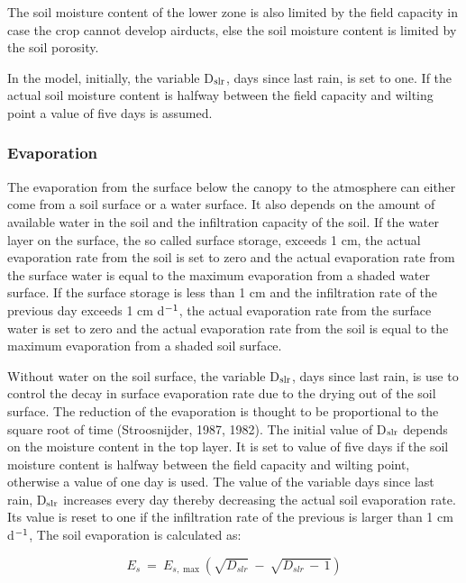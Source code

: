 The soil moisture content of the lower zone is also limited by the field capacity in case the crop cannot develop airducts, else the soil moisture content is limited by the soil porosity. 

In the model, initially, the variable D$_{{\rm slr}}$, days since last rain, is set  to one. If the actual soil moisture content is halfway between the field capacity and wilting point a value of five days is assumed. 

\subsubsection{Evaporation}
\label{sec:evaporation}
The evaporation from the surface below the canopy to the atmosphere can either come from a soil surface or a water surface. It also depends on the amount of available water in the soil and the infiltration capacity of the soil. If the water layer on the surface, the so called surface storage, exceeds 1 cm, the actual evaporation rate from the soil is set to zero and the actual evaporation rate from the surface water is equal to the maximum evaporation from a shaded water surface. If the surface storage is less than 1 cm and the infiltration rate of the previous day exceeds 1 cm d$^{{\rm -1}}$, the actual evaporation rate from the surface water is set to zero and the actual evaporation rate from the soil is equal to the maximum evaporation from a shaded soil surface. 

Without water on the soil surface, the variable D$_{{\rm slr}}$, days since last rain, is use to control the decay in surface evaporation rate due to the drying out of the soil surface. The reduction of the evaporation is thought to be proportional to the square root of time (Stroosnijder, 1987, 1982). The initial value of D$_{{\rm slr}}$ depends on the moisture content in the top layer. It is set to value of five days if the soil moisture content is halfway between the field capacity and wilting point, otherwise a value of one day is used. The value of the variable days since last rain, D$_{{\rm slr}}$ increases every day thereby decreasing the actual soil evaporation rate. Its value is reset to one if the infiltration rate of the previous is larger than 1 cm d$^{{\rm -1}}$, The soil evaporation is calculated as:

\begin{equation}
\label{eq:Es}
E_{s} ~=~ E_{s,\max } ( \sqrt{D_{slr} } ~-~ \sqrt{D_{slr} \, -\, 1} )
\end{equation}

